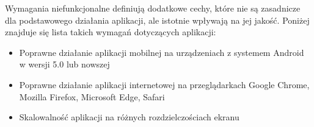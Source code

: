 Wymagania niefunkcjonalne definiują dodatkowe cechy, które nie są zasadnicze dla podstawowego działania aplikacji, ale istotnie wpływają na jej jakość. Poniżej znajduje się lista takich wymagań dotyczących aplikacji:
\begin{itemize}
    \item Poprawne działanie aplikacji mobilnej na urządzeniach z systemem Android w wersji 5.0 lub nowszej
    \item Poprawne działanie aplikacji internetowej na przeglądarkach Google Chrome, Mozilla Firefox, Microsoft Edge, Safari
    \item Skalowalność aplikacji na różnych rozdzielczościach ekranu
\end{itemize}